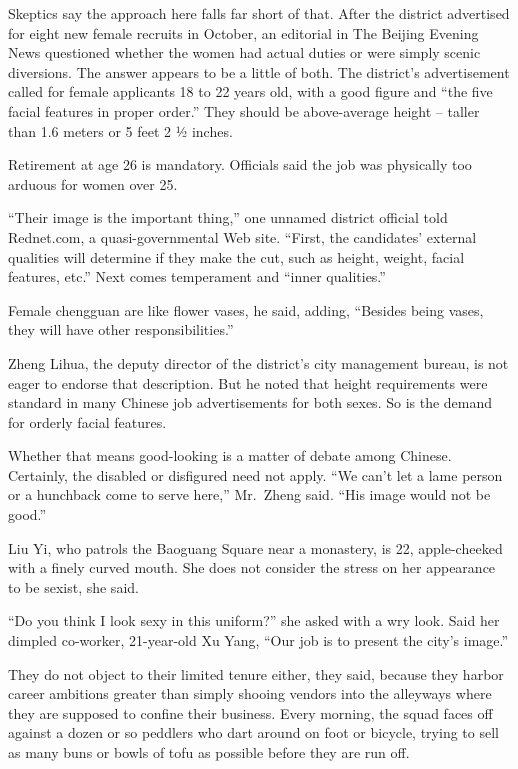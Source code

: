 ﻿\documentclass[12pt]{article}
\begin{document}
Skeptics say the approach here falls far short of that. After the district advertised for eight new
female recruits in October, an editorial in The Beijing Evening News questioned whether the women
had actual duties or were simply scenic diversions. The answer appears to be a little of both. The
district's advertisement called for female applicants 18 to 22 years old, with a good figure and
``the five facial features in proper order.'' They should be above-average height -- taller than 1.6
meters or 5 feet 2 ½ inches.

Retirement at age 26 is mandatory. Officials said the job was physically too arduous for women over
25.

``Their image is the important thing,'' one unnamed district official told Rednet.com, a
quasi-governmental Web site. ``First, the candidates' external qualities will determine if they make
the cut, such as height, weight, facial features, etc.'' Next comes temperament and ``inner
qualities.''

Female chengguan are like flower vases, he said, adding, ``Besides being vases, they will have other
responsibilities.''

Zheng Lihua, the deputy director of the district's city management bureau, is not eager to endorse
that description. But he noted that height requirements were standard in many Chinese job
advertisements for both sexes. So is the demand for orderly facial features.

Whether that means good-looking is a matter of debate among Chinese. Certainly, the disabled or
disfigured need not apply. ``We can't let a lame person or a hunchback come to serve here,''
Mr.~Zheng said. ``His image would not be good.''

Liu Yi, who patrols the Baoguang Square near a monastery, is 22, apple-cheeked with a finely curved
mouth. She does not consider the stress on her appearance to be sexist, she said.

``Do you think I look sexy in this uniform?'' she asked with a wry look. Said her dimpled co-worker,
21-year-old Xu Yang, ``Our job is to present the city's image.''

They do not object to their limited tenure either, they said, because they harbor career ambitions
greater than simply shooing vendors into the alleyways where they are supposed to confine their
business. Every morning, the squad faces off against a dozen or so peddlers who dart around on foot
or bicycle, trying to sell as many buns or bowls of tofu as possible before they are run off.
\end{document}
